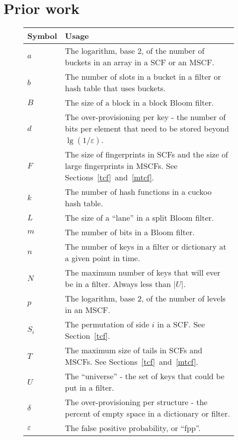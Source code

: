 \documentclass[letterpaper,twocolumn,10pt]{article}
\newcommand{\TCF}{SCF}
\newcommand{\MTCF}{MSCF}
\newcommand{\TCF}{TCF}
\newcommand{\MTCF}{MTCF}
\begin{document}

\section{Prior work}

\begin{figure}[t!]
\begin{tabular}{|m{0.5in}|m{2.5in}|}
\hline {\bf Symbol} & {\bf Usage} \\
\hline $a$ & The logarithm, base 2, of the number of buckets in an array in a \TCF{} or an \MTCF{}. \\
\hline $b$ & The number of slots in a bucket in a filter or hash table that uses buckets. \\
\hline $B$ & The size of a block in a block Bloom filter. \\
\hline $d$ & The over-provisioning per key - the number of bits per element that need to be stored beyond $\lg (1/\varepsilon)$. \\
\hline $F$ & The size of fingerprints in \TCF{}s and the size of large fingerprints in \MTCF{}s.
See Sections~\ref{tcf}~and~\ref{mtcf}. \\
\hline $k$ & The number of hash functions in a cuckoo hash table. \\
\hline $L$ & The size of a ``lane'' in a split Bloom filter. \\
\hline $m$ & The number of bits in a Bloom filter. \\
\hline $n$ & The number of keys in a filter or dictionary at a given point in time. \\
\hline $N$ & The maximum number of keys that will ever be in a filter.
Always less than $|U|$. \\
\hline $p$ & The logarithm, base 2, of the number of levels in an \MTCF{}. \\
\hline $S_i$ & The permutation of side $i$ in a \TCF{}.
See Section~\ref{tcf}. \\
\hline $T$ & The maximum size of tails in \TCF{}s and \MTCF{}s.
See Sections~\ref{tcf}~and~\ref{mtcf}. \\
\hline $U$ & The ``universe'' - the set of keys that could be put in a filter. \\
\hline $\delta$ & The over-provisioning per structure - the percent of empty space in a dictionary or filter. \\
\hline $\varepsilon$ & The false positive probability, or ``fpp''. \\
\hline
\end{tabular}
\end{figure}
\end{document}
